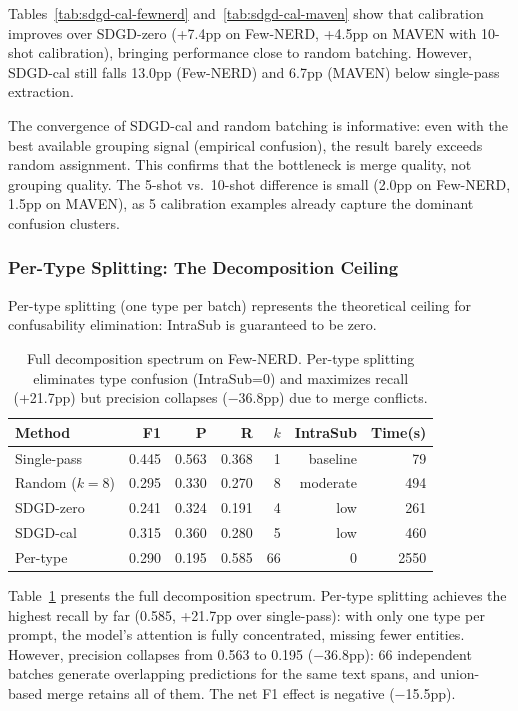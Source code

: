 \documentclass[11pt,a4paper]{article}
\begin{document}
Tables~\ref{tab:sdgd-cal-fewnerd} and~\ref{tab:sdgd-cal-maven} show that calibration improves over SDGD-zero (+7.4pp on Few-NERD, +4.5pp on MAVEN with 10-shot calibration), bringing performance close to random batching. However, SDGD-cal still falls 13.0pp (Few-NERD) and 6.7pp (MAVEN) below single-pass extraction.

The convergence of SDGD-cal and random batching is informative: even with the best available grouping signal (empirical confusion), the result barely exceeds random assignment. This confirms that the bottleneck is merge quality, not grouping quality. The 5-shot vs.\ 10-shot difference is small (2.0pp on Few-NERD, 1.5pp on MAVEN), as 5 calibration examples already capture the dominant confusion clusters.

\subsubsection{Per-Type Splitting: The Decomposition Ceiling}

Per-type splitting (one type per batch) represents the theoretical ceiling for confusability elimination: IntraSub is guaranteed to be zero.

\begin{table}[t]
\centering
\caption{Full decomposition spectrum on Few-NERD. Per-type splitting eliminates type confusion (IntraSub=0) and maximizes recall (+21.7pp) but precision collapses ($-$36.8pp) due to merge conflicts.}
\label{tab:pertype}
\begin{tabular}{lrrrrrr}
\toprule
Method & F1 & P & R & $k$ & IntraSub & Time(s) \\
\midrule
Single-pass  & 0.445 & 0.563 & 0.368 & 1  & baseline & 79   \\
Random ($k{=}8$) & 0.295 & 0.330 & 0.270 & 8  & moderate & 494  \\
SDGD-zero    & 0.241 & 0.324 & 0.191 & 4  & low      & 261  \\
SDGD-cal     & 0.315 & 0.360 & 0.280 & 5  & low      & 460  \\
Per-type     & 0.290 & 0.195 & 0.585 & 66 & 0        & 2550 \\
\bottomrule
\end{tabular}
\end{table}

Table~\ref{tab:pertype} presents the full decomposition spectrum. Per-type splitting achieves the highest recall by far (0.585, +21.7pp over single-pass): with only one type per prompt, the model's attention is fully concentrated, missing fewer entities. However, precision collapses from 0.563 to 0.195 ($-$36.8pp): 66 independent batches generate overlapping predictions for the same text spans, and union-based merge retains all of them. The net F1 effect is negative ($-$15.5pp).
\end{document}
